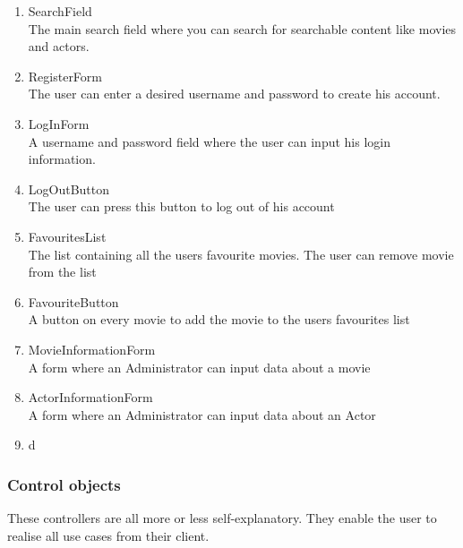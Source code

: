 \begin{enumerate}

	

	\item SearchField \hfill \\
	The main search field where you can search for searchable content like movies and actors.
	
	\item RegisterForm \hfill \\
	The user can enter a desired username and password to create his account.

	\item LogInForm \hfill \\
	A username and password field where the user can input his login information.
	
	\item LogOutButton \hfill \\
	The user can press this button to log out of his account
	
	\item FavouritesList \hfill \\
	The list containing all the users favourite movies. The user can remove movie from the list
	
	\item FavouriteButton \hfill \\
	A button on every movie to add the movie to the users favourites list
	
	\item MovieInformationForm \hfill \\
	A form where an Administrator can input data about a movie
	
	\item ActorInformationForm \hfill \\
	A form where an Administrator can input data about an Actor
	
	\item d 
	
\end{enumerate}

\subsubsection{Control objects}

These controllers are all more or less self-explanatory. They enable the user to realise all use cases from their client.

